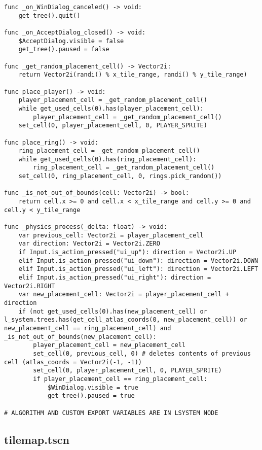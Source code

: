 \begin{lstlisting}
func _on_WinDialog_canceled() -> void:
	get_tree().quit()

func _on_AcceptDialog_closed() -> void:
	$AcceptDialog.visible = false
	get_tree().paused = false

func _get_random_placement_cell() -> Vector2i:
	return Vector2i(randi() % x_tile_range, randi() % y_tile_range)

func place_player() -> void:
	player_placement_cell = _get_random_placement_cell()
	while get_used_cells(0).has(player_placement_cell):
		player_placement_cell = _get_random_placement_cell()
	set_cell(0, player_placement_cell, 0, PLAYER_SPRITE)

func place_ring() -> void:
	ring_placement_cell = _get_random_placement_cell()
	while get_used_cells(0).has(ring_placement_cell):
		ring_placement_cell = _get_random_placement_cell()
	set_cell(0, ring_placement_cell, 0, rings.pick_random())

func _is_not_out_of_bounds(cell: Vector2i) -> bool:
	return cell.x >= 0 and cell.x < x_tile_range and cell.y >= 0 and cell.y < y_tile_range

func _physics_process(_delta: float) -> void:
	var previous_cell: Vector2i = player_placement_cell
	var direction: Vector2i = Vector2i.ZERO
	if Input.is_action_pressed("ui_up"): direction = Vector2i.UP
	elif Input.is_action_pressed("ui_down"): direction = Vector2i.DOWN
	elif Input.is_action_pressed("ui_left"): direction = Vector2i.LEFT
	elif Input.is_action_pressed("ui_right"): direction = Vector2i.RIGHT
	var new_placement_cell: Vector2i = player_placement_cell + direction
	if (not get_used_cells(0).has(new_placement_cell) or l_system.trees.has(get_cell_atlas_coords(0, new_placement_cell)) or new_placement_cell == ring_placement_cell) and _is_not_out_of_bounds(new_placement_cell):
		player_placement_cell = new_placement_cell
		set_cell(0, previous_cell, 0) # deletes contents of previous cell (atlas_coords = Vector2i(-1, -1))
		set_cell(0, player_placement_cell, 0, PLAYER_SPRITE)
		if player_placement_cell == ring_placement_cell:
			$WinDialog.visible = true
			get_tree().paused = true

# ALGORITHM AND CUSTOM EXPORT VARIABLES ARE IN LSYSTEM NODE
\end{lstlisting}

\subsection{tile\textunderscore{}map.tscn}

